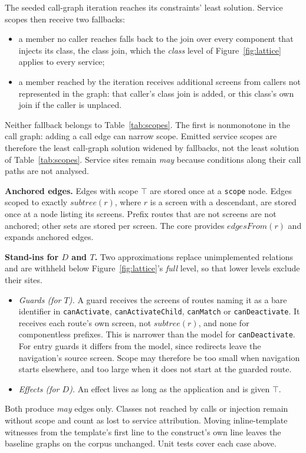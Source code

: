 The seeded call-graph iteration reaches its constraints' least solution. Service scopes
then receive two fallbacks:
\begin{itemize}
\item a member no caller reaches falls back to the join over every component that injects its
class, the class join, which the \emph{class} level of Figure~\ref{fig:lattice} applies to every service;
\item a member reached by the iteration receives additional screens from callers not represented
in the graph: that caller's class join is added, or this class's own join if the caller is unplaced.
\end{itemize}
Neither fallback belongs to Table~\ref{tab:scopes}. The first is nonmonotone in the call
graph: adding a call edge can narrow scope. Emitted service scopes are therefore the least
call-graph solution widened by fallbacks, not the least solution of Table~\ref{tab:scopes}.
Service sites remain \emph{may} because conditions along their call paths are not analysed.

\textbf{Anchored edges.} Edges with scope $\top$ are stored once at a \texttt{scope} node.
Edges scoped to exactly $\mathit{subtree}(r)$, where $r$ is a screen with a descendant, are
stored once at a node listing its screens. Prefix routes that are not screens are not anchored; other sets are stored per
screen. The core provides $\mathit{edgesFrom}(r)$ and expands anchored edges.

\textbf{Stand-ins for $D$ and $T$.} Two approximations replace unimplemented relations and are withheld below Figure~\ref{fig:lattice}'s \emph{full} level, so that lower levels exclude their sites.
\begin{itemize}
\item \emph{Guards (for $T$).} A guard receives the screens of routes naming it as a bare
identifier in \texttt{canActivate}, \texttt{canActivateChild}, \texttt{canMatch} or
\texttt{canDeactivate}. It receives each route's own screen, not $\mathit{subtree}(r)$,
and none for componentless prefixes. This is narrower than the model for \texttt{canDeactivate}.
For entry guards it differs from the model, since redirects leave the navigation's source
screen. Scope may therefore be too small when navigation starts elsewhere, and too large
when it does not start at the guarded route.
\item \emph{Effects (for $D$).} An effect lives as long as the application and is given $\top$.
\end{itemize}
Both produce \emph{may} edges only. Classes not reached by calls or injection remain without
scope and count as lost to service attribution. Moving
inline-template witnesses from the template's first line to the construct's own line leaves the
baseline graphs on the corpus unchanged. Unit tests cover
each case above.


